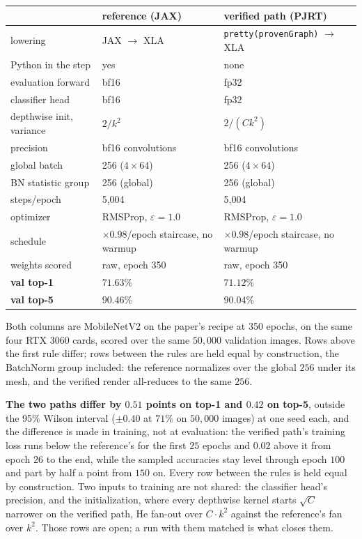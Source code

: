 \begin{center}
\begin{tabular}{@{}l l l@{}}
\hline
 & reference (JAX) & verified path (PJRT) \\
\hline
lowering             & JAX $\to$ XLA            & \texttt{pretty(provenGraph)} $\to$ XLA \\
Python in the step   & yes                      & none \\
evaluation forward   & bf16                     & fp32 \\
classifier head      & bf16                     & fp32 \\
depthwise init, variance & $2/k^2$              & $2/(C k^2)$ \\
\hline
precision            & bf16 convolutions        & bf16 convolutions \\
global batch         & 256 ($4\times64$)        & 256 ($4\times64$) \\
BN statistic group   & 256 (global)             & 256 (global) \\
steps/epoch          & 5{,}004                  & 5{,}004 \\
optimizer            & RMSProp, $\varepsilon=1.0$ & RMSProp, $\varepsilon=1.0$ \\
schedule             & $\times0.98$/epoch staircase, no warmup & $\times0.98$/epoch staircase, no warmup \\
weights scored       & raw, epoch 350           & raw, epoch 350 \\
\hline
\textbf{val top-1}   & $\mathbf{71.63\%}$       & $\mathbf{71.12\%}$ \\
\textbf{val top-5}   & $\mathbf{90.46\%}$       & $\mathbf{90.04\%}$ \\
\hline
\end{tabular}
\end{center}

\noindent Both columns are MobileNetV2 on the paper's recipe at 350
epochs, on the same four RTX 3060 cards, scored over the same $50{,}000$
validation images. Rows above the first rule differ; rows between the
rules are held equal by construction, the BatchNorm group included: the
reference normalizes over the global $256$ under its mesh, and the
verified render all-reduces to the same $256$.

\medskip\noindent\textbf{The two paths differ by $0.51$ points on top-1
and $0.42$ on top-5}, outside the 95\% Wilson interval ($\pm0.40$ at
$71\%$ on $50{,}000$ images) at one seed each, and the difference is made
in training, not at evaluation: the verified path's training loss runs
below the reference's for the first $25$ epochs and $0.02$ above it from
epoch $26$ to the end, while the sampled accuracies stay level through
epoch $100$ and part by half a point from $150$ on. Every row between the
rules is held equal by construction. Two inputs to training are not
shared: the classifier head's precision, and the initialization, where
every depthwise kernel starts $\sqrt{C}$ narrower on the verified path,
He fan-out over $C \cdot k^2$ against the reference's fan over $k^2$. Those
rows are open; a run with them matched is what closes them.

